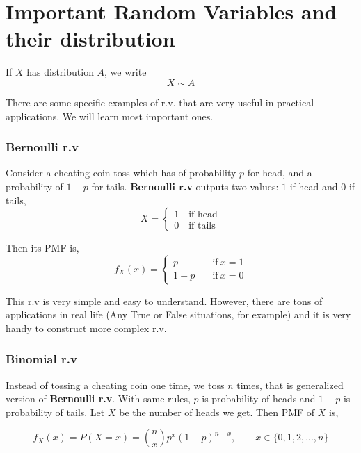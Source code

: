 

\section{Important Random Variables and their distribution}
\begin{definition}
    If $X$ has distribution $A$, we write
    \[ X \sim A\]
\end{definition}
There are some specific examples of r.v. that are very useful in practical applications. We will learn most important ones.

\subsubsection*{Bernoulli r.v}
Consider a cheating coin toss which has of probability $p$ for head, and a probability of $1-p$ for tails. \textbf{Bernoulli r.v} outputs two values: $1$ if head and $0$ if tails,
\[X =\begin{cases}
        1 \quad \text{if head} \\
        0 \quad \text{if tails}
\end{cases} \]

Then its PMF is,
\[f_X(x) =\begin{cases}
    p \quad &\text{if} \ x=1\\
    1-p \quad &\text{if} \ x=0
\end{cases} \]

This r.v is very simple and easy to understand. However, there are tons of applications in real life (Any True or False situations, for example) and it is very handy to construct more complex r.v.

\subsubsection*{Binomial r.v}
Instead of tossing a cheating coin one time, we toss $n$ times, that is generalized version of \textbf{Bernoulli r.v}. With same rules, $p$ is probability of heads and $1-p$ is probability of tails. Let $X$ be the number of heads we get. Then PMF of $X$ is,

\[f_X(x) = P(X = x) =  \binom{n}{x}p^x (1-p)^{n-x}, \qquad x \in \{0,1,2,...,n \} \]


